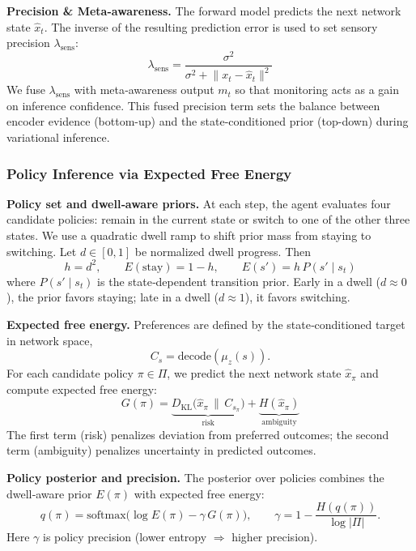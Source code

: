 \documentclass[openacc]{rsproca_new}%
\begin{document}
\textbf{Precision \& Meta-awareness.} The forward model predicts the next network state \(\hat{x}_t\). The inverse of the resulting prediction error is used to set sensory precision \(\lambda_{\mathrm{sens}}\):
\begin{equation}
\lambda_{\mathrm{sens}} = \frac{\sigma^2}{\sigma^2 + \lVert x_t - \hat{x}_t \rVert^2}
\tag{4}
\end{equation}
We fuse \(\lambda_{\mathrm{sens}}\) with meta‑awareness output \(m_t\) so that monitoring acts as a gain on inference confidence. This fused precision term sets the balance between encoder evidence (bottom-up) and the state‑conditioned prior (top-down) during variational inference.

\subsubsection{Policy Inference via Expected Free Energy}

\textbf{Policy set and dwell‑aware priors.}
At each step, the agent evaluates four candidate policies: remain in the current state or switch to one of the other three states. We use a quadratic dwell ramp to shift prior mass from staying to switching. Let \(d \in [0,1]\) be normalized dwell progress. Then
\[
h = d^2,\qquad
E(\text{stay}) = 1-h,\qquad
E(s') = h\,P(s' \mid s_t)
\tag{5}
\]
where \(P(s' \mid s_t)\) is the state‑dependent transition prior. Early in a dwell (\(d \approx 0\)), the prior favors staying; late in a dwell (\(d \approx 1\)), it favors switching.

\textbf{Expected free energy.}
Preferences are defined by the state‑conditioned target in network space,
\[
C_s = \mathrm{decode}(\mu_z(s)).
\]
For each candidate policy \(\pi \in \Pi\), we predict the next network state \(\hat{x}_\pi\) and compute expected free energy:
\begin{equation}
G(\pi) =
\underbrace{D_{\mathrm{KL}}\!\big(\hat{x}_\pi \,\|\, C_{s_\pi}\big)}_{\text{risk}}
+
\underbrace{H(\hat{x}_\pi)}_{\text{ambiguity}}
\tag{6}
\end{equation}
The first term (risk) penalizes deviation from preferred outcomes; the second term (ambiguity) penalizes uncertainty in predicted outcomes.

\textbf{Policy posterior and precision.}
The posterior over policies combines the dwell‑aware prior \(E(\pi)\) with expected free energy:
\begin{equation}
q(\pi) = \mathrm{softmax}\!\big(\log E(\pi) - \gamma\, G(\pi)\big),
\qquad
\gamma = 1 - \frac{H\!\left(q(\pi)\right)}{\log |\Pi|}.
\tag{7}
\end{equation}
Here \(\gamma\) is policy precision (lower entropy \(\Rightarrow\) higher precision).
\end{document}
